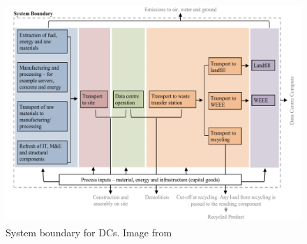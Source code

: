 \begin{figure} [!h]
\centering
\includegraphics[scale=.6]{methodology/images/LCAphases.eps}
\caption[Whitehead DC LCA Boundary]{System boundary for DCs. Image from \cite{whitehead15}}
\label{LCAphases}
\end{figure}